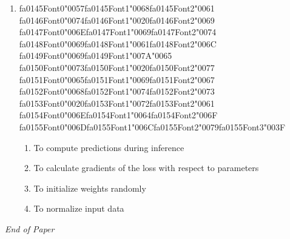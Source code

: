 \documentclass[12pt]{article}
\begin{document}
\begin{enumerate}[label=Q\arabic*.]
{\csname fa0137Font0\endcsname\char"0061}{\csname fa0137Font1\endcsname\char"0070}{\csname fa0137Font2\endcsname\char"0065} {\csname fa0138Font0\endcsname\char"0020}{\csname fa0138Font1\endcsname\char"0069}{\csname fa0138Font2\endcsname\char"0073} {\csname fa0139Font0\endcsname\char"0020}{\csname fa0139Font1\endcsname\char"0024}{\csname fa0139Font2\endcsname\char"0028} {\csname fa0140Font0\endcsname\char"006E}{\csname fa0140Font1\endcsname\char"005F}{\csname fa0140Font2\endcsname\char"0030} {\csname fa0141Font0\endcsname\char"0020}{\csname fa0141Font1\endcsname\char"005C}{\csname fa0141Font2\endcsname\char"0074} {\csname fa0142Font0\endcsname\char"0069}{\csname fa0142Font1\endcsname\char"006D}{\char"0065} {\csname fa0143Font0\endcsname\char"0073}{\csname fa0143Font1\endcsname\char"0020}{\csname fa0143Font2\endcsname\char"0031} {\csname fa0144Font0\endcsname\char"0029}{\char"0024}{\char"003F}
\begin{enumerate}[label=(\Alph*)]
    \item $(n_0 \times n_1)$
    \item $(n_1 \times n_0)$
    \item $(n_0 \times 1)$
    \item $(1 \times n_1)$
\end{enumerate}
\item {\csname fa0145Font0\endcsname\char"0057}{\csname fa0145Font1\endcsname\char"0068}{\csname fa0145Font2\endcsname\char"0061} {\csname fa0146Font0\endcsname\char"0074}{\csname fa0146Font1\endcsname\char"0020}{\csname fa0146Font2\endcsname\char"0069} {\csname fa0147Font0\endcsname\char"006E}{\csname fa0147Font1\endcsname\char"0069}{\csname fa0147Font2\endcsname\char"0074} {\csname fa0148Font0\endcsname\char"0069}{\csname fa0148Font1\endcsname\char"0061}{\csname fa0148Font2\endcsname\char"006C} {\csname fa0149Font0\endcsname\char"0069}{\csname fa0149Font1\endcsname\char"007A}{\char"0065} {\csname fa0150Font0\endcsname\char"0073}{\csname fa0150Font1\endcsname\char"0020}{\csname fa0150Font2\endcsname\char"0077} {\csname fa0151Font0\endcsname\char"0065}{\csname fa0151Font1\endcsname\char"0069}{\csname fa0151Font2\endcsname\char"0067} {\csname fa0152Font0\endcsname\char"0068}{\csname fa0152Font1\endcsname\char"0074}{\csname fa0152Font2\endcsname\char"0073} {\csname fa0153Font0\endcsname\char"0020}{\csname fa0153Font1\endcsname\char"0072}{\csname fa0153Font2\endcsname\char"0061} {\csname fa0154Font0\endcsname\char"006E}{\csname fa0154Font1\endcsname\char"0064}{\csname fa0154Font2\endcsname\char"006F} {\csname fa0155Font0\endcsname\char"006D}{\csname fa0155Font1\endcsname\char"006C}{\csname fa0155Font2\endcsname\char"0079}{\csname fa0155Font3\endcsname\char"003F}
\begin{enumerate}[label=(\Alph*)]
    \item To compute predictions during inference
    \item To calculate gradients of the loss with respect to parameters
    \item To initialize weights randomly
    \item To normalize input data
\end{enumerate}
\end{enumerate}

\vfill
\noindent\textit{End of Paper}
\end{document}
